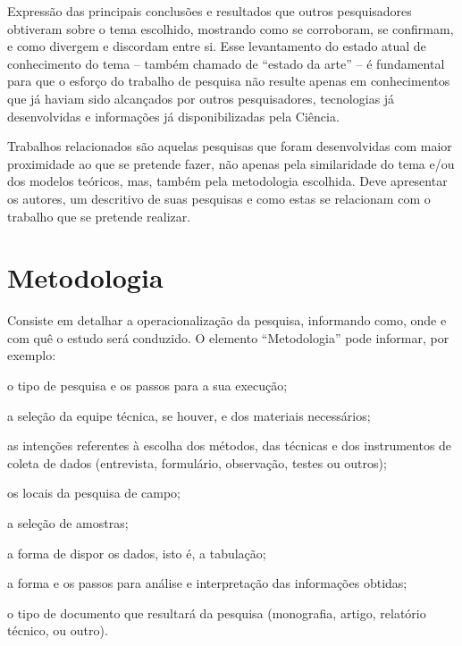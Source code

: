 \documentclass[12pt,oneside,a4paper,chapter=TITLE,section=TITLE,sumario=tradicional]{abntex2}
\begin{document}
Expressão das principais conclusões e resultados que outros pesquisadores 
obtiveram sobre o tema escolhido, mostrando como se corroboram, se confirmam, e 
como divergem e discordam entre si. Esse levantamento do estado atual de 
conhecimento do tema – também chamado de ``estado da arte'' – é fundamental para 
que o esforço do trabalho de pesquisa não resulte apenas em conhecimentos que 
já haviam sido alcançados por outros pesquisadores, tecnologias já 
desenvolvidas e informações já disponibilizadas pela Ciência.

Trabalhos relacionados são aquelas pesquisas que foram desenvolvidas com maior 
proximidade ao que se pretende fazer, não apenas pela similaridade do tema e/ou 
dos modelos teóricos, mas, também pela metodologia escolhida. Deve apresentar 
os autores, um descritivo de suas pesquisas e como estas se relacionam com o 
trabalho que se pretende realizar.

\chapter{Metodologia}
\label{cap:metodologia}

Consiste em detalhar a operacionalização da pesquisa, informando como, onde e 
com quê o estudo será conduzido. O elemento ``Metodologia'' pode informar, por 
exemplo:

\begin{lista}
    \item  o tipo de pesquisa e os passos para a sua execução;

    \item a seleção da equipe técnica, se houver, e dos materiais
necessários;

    \item as intenções referentes à escolha dos métodos, das técnicas
e dos instrumentos de coleta de dados (entrevista, formulário,
observação, testes ou outros);

    \item os locais da pesquisa de campo;

    \item a seleção de amostras;

    \item a forma de dispor os dados, isto é, a tabulação;

    \item a forma e os passos para análise e interpretação das
informações obtidas;

    \item o tipo de documento que resultará da pesquisa (monografia,
artigo, relatório técnico, ou outro).
\end{lista}
\end{document}
